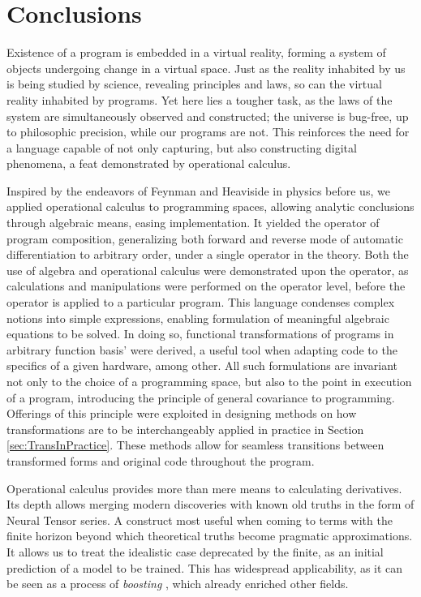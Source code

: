 \documentclass[smallcondensed]{svjour3}
\begin{document}
\section{Conclusions}

Existence of a program is embedded in a virtual reality, forming a system of objects undergoing change in a virtual space. Just as the reality inhabited by us is being studied by science, revealing principles and laws, so can the virtual reality inhabited by programs. Yet here lies a tougher task, as the laws of the system are simultaneously observed and constructed; the universe is bug-free, up to philosophic precision, while our programs are not. This reinforces the need for a language capable of not only capturing, but also constructing digital phenomena, a feat demonstrated by operational calculus. 

Inspired by the endeavors of Feynman \cite{Feynman} and Heaviside \cite{HeavisideOperational} in physics before us, we applied operational calculus to programming spaces, allowing analytic conclusions through algebraic means, easing implementation. It yielded the operator of program composition, generalizing both forward \cite{PcAD} and reverse \cite{ReverseAD} mode of automatic differentiation to arbitrary order, under a single operator in the theory. Both the use of algebra and operational calculus were demonstrated upon the operator, as calculations and manipulations were performed on the operator level, before the operator is applied to a particular program.
This language condenses complex notions into simple expressions, enabling formulation of meaningful algebraic equations to be solved. In doing so, functional transformations of programs in arbitrary function basis' were derived, a useful tool when adapting code to the specifics of a given hardware, among other.
All such formulations are invariant not only to the choice of a programming space, but also to the point in execution of a program, introducing the principle of general covariance \cite{GeneralCovariance} to programming. Offerings of this principle were exploited in designing methods on how transformations are to be interchangeably applied in practice in Section \ref{sec:TransInPractice}. These methods allow for seamless transitions between transformed forms and original code throughout the program.

Operational calculus provides more than mere means to calculating derivatives. Its depth allows merging modern discoveries with known old truths in the form of Neural Tensor series. A construct most useful when coming to terms with the finite horizon beyond which theoretical truths become pragmatic approximations. It allows us to treat the idealistic case deprecated by the finite, as an initial prediction of a model to be trained. This has widespread applicability, as it can be seen as a process of \emph{boosting} \cite{boosting}, which already enriched other fields. 
\end{document}
